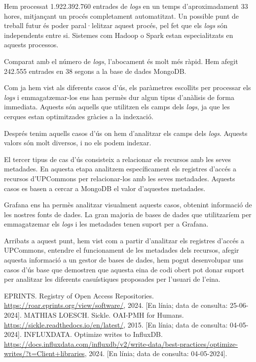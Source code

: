 \documentclass[lettersize,journal]{IEEEtran}
\begin{document}
Hem processat 1.922.392.760 entrades de \textit{logs} en un temps d'aproximadament 33 hores, mitjançant un procés completament automatitzat.
Un possible punt de treball futur és poder paral·lelitzar aquest procés, pel fet que els \textit{logs} són independents entre si.
Sistemes com Hadoop o Spark estan especialitzats en aquests processos.

Comparat amb el número de \textit{logs}, l'abocament és molt més ràpid.
Hem afegit 242.555 entrades en 38 segons a la base de dades MongoDB.

Com ja hem vist als diferents casos d'ús, els paràmetres escollits per processar els \textit{logs} i emmagatzemar-los ens han permès dur algun tipus d'anàlisis de forma immediata.
Aquests són aquells que utilitzen els camps dels \textit{logs}, ja que les cerques estan optimitzades gràcies a la indexació.

Després tenim aquells casos d'ús on hem d'analitzar els camps dels \textit{logs}.
Aquests valors són molt diversos, i no els podem indexar.

El tercer tipus de cas d'ús consisteix a relacionar els recursos amb les seves metadades.
En aquesta etapa analitzem específicament els registres d'accés a recursos d'UPCommons per relacionar-los amb les seves metadades.
Aquests casos es basen a cercar a MongoDB el valor d'aquestes metadades.

Grafana ens ha permès analitzar visualment aquests casos, obtenint informació de les nostres fonts de dades.
La gran majoria de bases de dades que utilitzaríem per emmagatzemar els \textit{logs} i les metadades tenen suport per a Grafana.

Arribats a aquest punt, hem vist com a partir d'analitzar els registres d'accés a UPCommons, entendre el funcionament de les metadades dels recursos, afegir aquesta informació a un gestor de bases de dades, hem pogut desenvolupar uns casos d'ús base que demostren que aquesta eina de codi obert pot donar suport per analitzar les diferents casuístiques proposades per l'usuari de l'eina.

\begin{thebibliography}{1}

    EPRINTS. Registry of Open Access Repositories. \url{https://roar.eprints.org/view/software/}, 2024. [En línia; data de consulta: 25-06-2024].
    MATHIAS LOESCH. Sickle. OAI-PMH for Humans. \url{https://sickle.readthedocs.io/en/latest/}, 2015. [En línia; data de consulta: 04-05-2024].
    INFLUXDATA. Optimize writes to InfluxDB. \url{https://docs.influxdata.com/influxdb/v2/write-data/best-practices/optimize-writes/?t=Client+libraries}, 2024. [En línia; data de consulta: 04-05-2024].
\end{thebibliography}
\end{document}
